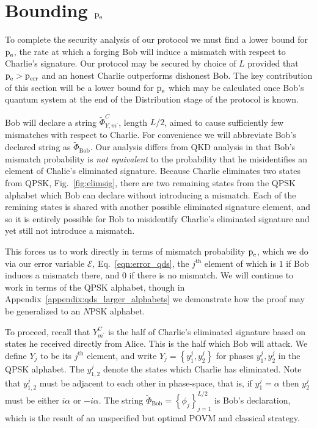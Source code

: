 \section{Bounding $\text{p}_{\text{e}}$}\label{sec:qds_bounding_pe}
To complete the security analysis of our protocol we must find a lower bound for $\text{p}_{\text{e}}$, the rate at which a forging Bob will induce a mismatch with respect to Charlie's signature. Our protocol may be secured by choice of $L$ provided that $\text{p}_{\text{e}} > \text{p}_{\text{err}}$ and an honest Charlie outperforms dishonest Bob. The key contribution of this section will be a lower bound for $\text{p}_{\text{e}}$ which may be calculated once Bob's quantum system at the end of the Distribution stage of the protocol is known.


Bob will declare a string $\tilde{\Phi}_{Y, m^\prime}^C$, length $L/2$, aimed to cause sufficiently few mismatches with respect to Charlie. For convenience we will abbreviate Bob's declared string as $\tilde{\Phi}_{\text{Bob}}$. %
Our analysis differs from QKD analysis in that Bob's mismatch probability is \emph{not equivalent} to the probability that he misidentifies an element of Chalie's eliminated signature. Because Charlie eliminates two states from QPSK, Fig.~\ref{fig:elimsig}, there are two remaining states from the QPSK alphabet which Bob can declare without introducing a mismatch. Each of the remining states is shared with another possible eliminated signature element, and so it is entirely possible for Bob to misidentify Charlie's eliminated signature and yet still not introduce a mismatch.

This forces us to work directly in terms of mismatch probability $\text{p}_{\text{e}}$, which we do via our error variable $\mathcal{E}$, Eq.~\ref{eqn:error_qds}, the $j^{\text{th}}$ element of which is $1$ if Bob induces a mismatch there, and $0$ if there is no mismatch. We will continue to work in terms of the QPSK alphabet, though in Appendix~\ref{appendix:qds_larger_alphabets} we demonstrate how the proof may be generalized to an $N$PSK alphabet.

To proceed, recall that $Y_{m^\prime}^C$ is the half of Charlie's eliminated signature based on states he received directly from Alice. This is the half which Bob will attack. We define $Y_j$ to be its $j^{\text{th}}$ element, and write $Y_j = \left\{ y_1^j, y_2^j\right\}$ for phases $y_1^j, y_2^j$ in the QPSK alphabet. The $y_{1,2}^j$ denote the states which Charlie has eliminated. Note that $y_{1,2}^j$ must be adjacent to each other in phase-space, that is, if $y_1^j = \alpha$ then $y_2^j$ must be either $i \alpha$ or $- i \alpha$. The string $\tilde{\Phi}_{\text{Bob}} = \left\{\phi_j\right\}_{j=1}^{L/2}$ is Bob's declaration, which is the result of an unspecified but optimal POVM and classical strategy.

